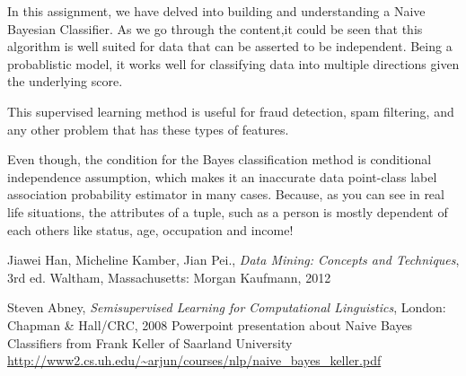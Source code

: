 \documentclass[a4paper]{article}
\begin{document}
	In this assignment, we have delved into building and understanding a Naive Bayesian Classifier. As we go through the content,it could be seen that this algorithm is well suited for data that can be asserted to be independent. Being a probablistic model, it works well for classifying data into multiple directions given the underlying score.
	
	This supervised learning method is useful for fraud detection, spam filtering, and any other problem that has these types of features.

	Even though, the condition for the Bayes classification method is conditional independence assumption, which makes it an inaccurate data point-class label association probability estimator in many cases. Because, as you can see in real life situations, the attributes of a tuple, such as a person is mostly dependent of each others like status, age, occupation and income!

\begin{thebibliography}{80}
		Jiawei Han, Micheline Kamber, Jian Pei., \textit{Data Mining: Concepts and Techniques}, 3rd ed. Waltham, Massachusetts: Morgan Kaufmann, 2012

		Steven Abney, \textit{Semisupervised Learning for Computational Linguistics},
			London: Chapman \& Hall/CRC, 2008
	Powerpoint presentation about Naive Bayes Classifiers from Frank Keller of Saarland University\\
	\url{http://www2.cs.uh.edu/~arjun/courses/nlp/naive_bayes_keller.pdf}
\end{thebibliography}
\end{document}
